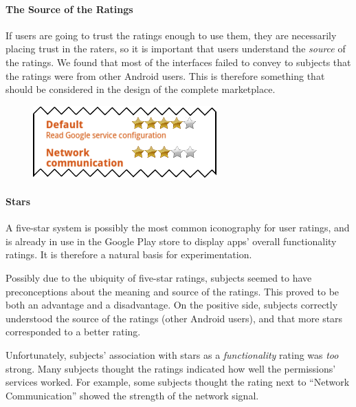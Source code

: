 \documentclass[11pt]{article}
\begin{document}
\paragraph{The Source of the Ratings}
\label{subsec-small-source}

If users are going to trust the ratings enough to use them, 
they are necessarily placing trust in the raters, so it is
important that users understand the \emph{source}
of the ratings. 
We found that most of the interfaces failed to
convey to subjects that the ratings were from other Android users.
This is therefore something that should be considered in the 
design of the complete marketplace.

\label{ss-sec-stars-r1}
\begin{figure}
\begin{center}
\includegraphics[width=.9\linewidth]{candidate-img/stars/starsR1.png}
\end{center}
\end{figure}

\paragraph{Stars}
\label{s-sec-stars}

A five-star system is possibly the most common iconography for user ratings,
and is already in use in the Google Play store to display apps' overall 
functionality ratings. It is therefore a natural basis for experimentation.



Possibly due to the ubiquity of five-star ratings, 
subjects seemed to have preconceptions 
about the meaning and source of the ratings. This proved to be both an 
advantage and a disadvantage. On the positive side, 
subjects correctly understood the source of
the ratings (other Android users), and that more stars corresponded to a 
better rating.

Unfortunately, subjects' association with stars as a \emph{functionality} rating 
was \emph{too} strong. Many subjects thought the ratings indicated how well 
the permissions' services worked. For example, some subjects thought the rating next 
to ``Network Communication'' showed the strength of the network signal. 
\end{document}
